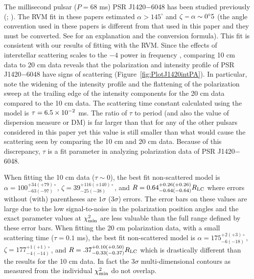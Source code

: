 The millisecond pulsar ($P=68$ ms) PSR J1420$-$6048 has 
been studied previously (\citealt{roberts2001multiwavelength};
\citealt{weltevrede2010gamma}).  
The RVM fit in these papers estimated $\alpha>145^\circ$ and $\zeta-\alpha\sim 0\hbox{$^\circ$}5$
(the angle convention used in these papers is different from that used
in this paper and they must be converted.  
See \citealt{everett2001emission} for an explanation and the conversion formula).
This fit is consistent with our results of fitting with the RVM.
Since the effects of interstellar scattering scales 
to the $-4$ power in frequency \citep{lang1971pulse}, 
comparing 10 cm data to 20 cm data reveals that 
the polarization and intensity profile of PSR J1420$-$6048 have 
signs of scattering (Figure~\ref{fig:PlotJ1420intPA}).  
In particular, note the widening of the intensity profile and the flattening
of the polarization sweep at the trailing edge of the intensity components for 
the 20 cm data compared to the 10 cm data.  The scattering
time constant calculated using the \citet{cordes2002ne2001} 
model is $\tau=6.5\times 10^{-2}$ ms.  The ratio of $\tau$
to period (and also the value of dispersion measure or DM) is far larger than that for any of the other
pulsars considered in this paper yet this value is still smaller than 
what would cause the scattering seen by comparing the 10 cm and 20 cm data.
Because of this discrepancy, $\tau$ is a fit parameter in analyzing 
polarization data of PSR J1420$-$6048. 

When fitting the 10 cm data ($\tau\sim0$), the best fit non-scattered model 
is $\alpha=100^{+34(+79)\circ}_{-63(-97)}$, $\zeta=39^{+116(+140)\circ}_{-25(-38)}$, and $R=0.64^{+0.26(+0.26)}_{-0.64(-0.64)}R_{\rm{LC}}$
where errors without (with) parentheses are $1\sigma$ ($3\sigma$) errors.
The error bars on these values are large due to 
the low signal-to-noise in the polarization position
angles and the exact parameter values at 
$\chi^2_{\rm{min}}$ are less valuable than the full range defined by these
error bars.  When fitting the 20 cm polarization data, 
with a small scattering time ($\tau=0.1$ ms), 
the best fit non-scattered model is $\alpha=175^{+2(+3)\circ}_{-6(-18)}$, $\zeta=177^{+1(+1)\circ}_{-4(-14)}$, and 
$R=.37^{+0.10(+0.50)}_{-0.33(-0.37)}R_{\rm{LC}}$ which is drastically different
than the results for the 10 cm data.  In fact the $3\sigma$ multi-dimensional contours as
measured from the individual $\chi^2_{\rm{min}}$ do not overlap.

